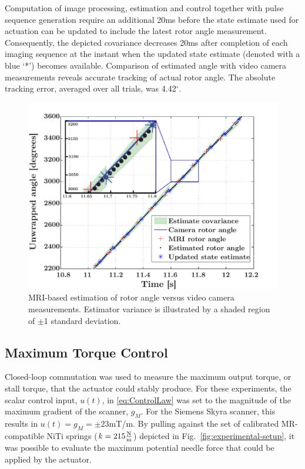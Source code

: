 \documentclass[journal]{IEEEtran}
\begin{document}
Computation of image processing, estimation and control together with pulse sequence generation require an additional 20ms before the state estimate used for actuation can be updated to include the latest rotor angle measurement. Consequently, the depicted covariance decreases 20ms after completion of each imaging sequence at the instant when the updated state estimate (denoted with a blue `*') becomes available. Comparison of estimated angle with video camera measurements reveals accurate tracking of actual rotor angle.  The absolute tracking error, averaged over all trials, was 4.42$^\circ$.  

\begin{figure}
\begin{center}
	\includegraphics[width=1.0\columnwidth]{Figure13.pdf}
\end{center}
\caption{MRI-based estimation of rotor angle versus video camera measurements. Estimator variance is illustrated by a shaded region of $\pm$1 standard deviation.}
\label{fig:Estimate-Performance-PlusZoom}
\vspace{-5pt}
\end{figure}

\subsection{Maximum Torque Control}\label{subsec:ExpMaxTorque}

Closed-loop commutation was used to measure the maximum output torque, or stall torque, that the actuator could stably produce. For these experiments, the scalar control input, $u(t)$, in \eqref{eq:ControlLaw} was set to the magnitude of the maximum gradient of the scanner, $g_M$. For the Siemens Skyra scanner, this results in $u(t)=g_M=\pm 23$mT/m. By pulling against the set of  calibrated MR-compatible NiTi springs ($k = 215\frac{\textnormal{N}}{\textnormal{m}}$) depicted in Fig.\ \ref{fig:experimental-setup}, it was possible to evaluate the maximum potential needle force that could be applied by the actuator. 
\end{document}
